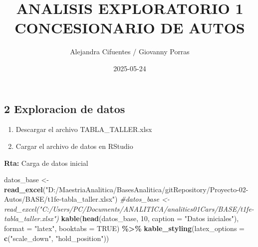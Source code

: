 \documentclass[
]{article}
\title{ANALISIS EXPLORATORIO 1 CONCESIONARIO DE AUTOS}
\author{Alejandra Cifuentes / Giovanny Porras}
\date{2025-05-24}
\newenvironment{Shaded}{\begin{snugshade}}{\end{snugshade}}
\newcommand{\AttributeTok}[1]{\textcolor[rgb]{0.13,0.29,0.53}{#1}}
\newcommand{\CommentTok}[1]{\textcolor[rgb]{0.56,0.35,0.01}{\textit{#1}}}
\newcommand{\ConstantTok}[1]{\textcolor[rgb]{0.56,0.35,0.01}{#1}}
\newcommand{\DecValTok}[1]{\textcolor[rgb]{0.00,0.00,0.81}{#1}}
\newcommand{\FunctionTok}[1]{\textcolor[rgb]{0.13,0.29,0.53}{\textbf{#1}}}
\newcommand{\NormalTok}[1]{#1}
\newcommand{\OtherTok}[1]{\textcolor[rgb]{0.56,0.35,0.01}{#1}}
\newcommand{\SpecialCharTok}[1]{\textcolor[rgb]{0.81,0.36,0.00}{\textbf{#1}}}
\newcommand{\StringTok}[1]{\textcolor[rgb]{0.31,0.60,0.02}{#1}}
\providecommand{\tightlist}{%
  \setlength{\itemsep}{0pt}\setlength{\parskip}{0pt}}
\begin{document}
\maketitle

{
\setcounter{tocdepth}{2}
\tableofcontents
}
\subsection{2 Exploracion de datos}\label{exploracion-de-datos}

\begin{enumerate}
\def\labelenumi{\alph{enumi}.}
\tightlist
\item
  Descargar el archivo TABLA\_TALLER.xlsx
\item
  Cargar el archivo de datos en RStudio
\end{enumerate}

\textbf{Rta:} Carga de datos inicial

\begin{Shaded}
\begin{Highlighting}[]
\NormalTok{datos\_base }\OtherTok{\textless{}{-}} \FunctionTok{read\_excel}\NormalTok{(}\StringTok{"D:/MaestriaAnalitica/BasesAnalitica/gitRepository/Proyecto{-}02{-}Autos/BASE/t1fe{-}tabla\_taller.xlsx"}\NormalTok{)}
\CommentTok{\#datos\_base \textless{}{-} read\_excel("C:/Users/PC/Documents/ANALITICA/analitics01Cars/BASE/t1fe{-}tabla\_taller.xlsx")}
\FunctionTok{kable}\NormalTok{(}\FunctionTok{head}\NormalTok{(datos\_base, }\DecValTok{10}\NormalTok{,  }\AttributeTok{caption =} \StringTok{"Datos iniciales"}\NormalTok{), }\AttributeTok{format =} \StringTok{"latex"}\NormalTok{, }\AttributeTok{booktabs =} \ConstantTok{TRUE}\NormalTok{) }\SpecialCharTok{\%\textgreater{}\%} 
  \FunctionTok{kable\_styling}\NormalTok{(}\AttributeTok{latex\_options =} \FunctionTok{c}\NormalTok{(}\StringTok{"scale\_down"}\NormalTok{, }\StringTok{"hold\_position"}\NormalTok{))}
\end{Highlighting}
\end{Shaded}
\end{document}
